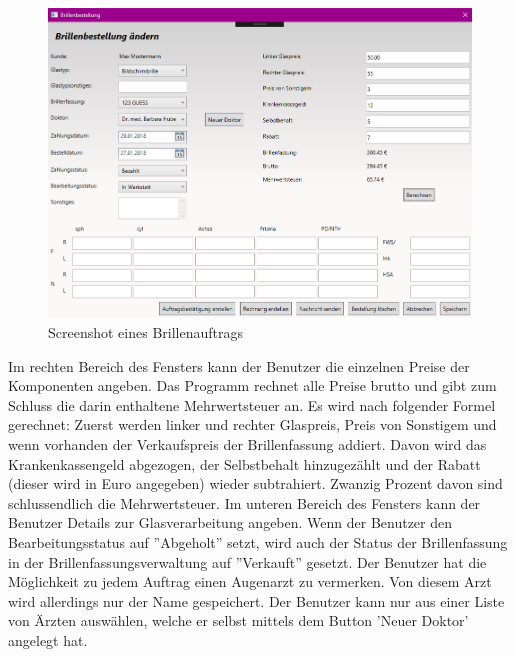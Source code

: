 \begin{figure}[H]
\begin{center}
	\includegraphics[scale=.6]{images/Brillenauftrag.png}
\end{center}
	\caption{Screenshot eines Brillenauftrags}
	\label{fig:sample}
\end{figure} \noindent Im rechten Bereich des Fensters kann der Benutzer die einzelnen Preise der Komponenten angeben. Das Programm rechnet alle Preise  brutto und gibt zum Schluss die darin enthaltene Mehrwertsteuer an. \newline Es wird nach folgender Formel gerechnet: Zuerst werden linker und rechter Glaspreis, Preis von Sonstigem und wenn vorhanden der Verkaufspreis der Brillenfassung addiert. Davon wird das Krankenkassengeld abgezogen, der Selbstbehalt hinzugezählt und der Rabatt (dieser wird in Euro angegeben) wieder subtrahiert. Zwanzig Prozent davon sind schlussendlich die Mehrwertsteuer. \newline
Im unteren Bereich des Fensters kann der Benutzer Details zur Glasverarbeitung angeben. Wenn der Benutzer den Bearbeitungsstatus auf ''Abgeholt'' setzt, wird auch der Status der Brillenfassung in der Brillenfassungsverwaltung auf ''Verkauft'' gesetzt. \newline Der Benutzer hat die Möglichkeit zu jedem Auftrag einen Augenarzt zu vermerken. Von diesem Arzt wird allerdings nur der Name gespeichert. Der Benutzer kann nur aus einer Liste von Ärzten auswählen, welche er  selbst mittels dem Button 'Neuer Doktor' angelegt hat.
